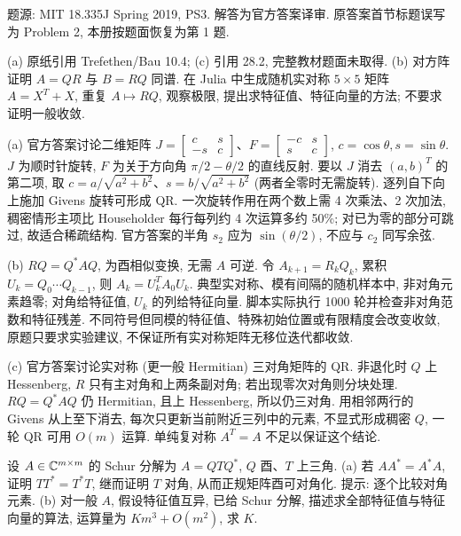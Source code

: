 题源: MIT 18.335J Spring 2019, PS3. 解答为官方答案译审. 原答案首节标题误写为 Problem 2, 本册按题面恢复为第 1 题.
\begin{exercise}\label{ps3:q1}
(a) 原纸引用 Trefethen/Bau 10.4; (c) 引用 28.2, 完整教材题面未取得.
(b) 对方阵证明 $A=QR$ 与 $B=RQ$ 同谱. 在 Julia 中生成随机实对称 $5\times5$ 矩阵 $A=X^T+X$, 重复 $A\mapsto RQ$, 观察极限, 提出求特征值、特征向量的方法; 不要求证明一般收敛.
\end{exercise}
\begin{solution}
(a) 官方答案讨论二维矩阵 $J=\begin{bmatrix}c&s\\-s&c\end{bmatrix}$、$F=\begin{bmatrix}-c&s\\s&c\end{bmatrix}$, $c=\cos\theta,s=\sin\theta$. $J$ 为顺时针旋转, $F$ 为关于方向角 $\pi/2-\theta/2$ 的直线反射. 要以 $J$ 消去 $(a,b)^T$ 的第二项, 取 $c=a/\sqrt{a^2+b^2}$、$s=b/\sqrt{a^2+b^2}$ (两者全零时无需旋转). 逐列自下向上施加 Givens 旋转可形成 QR. 一次旋转作用在两个数上需 4 次乘法、2 次加法, 稠密情形主项比 Householder 每行每列约 4 次运算多约 50\%; 对已为零的部分可跳过, 故适合稀疏结构. 官方答案的半角 $s_2$ 应为 $\sin(\theta/2)$, 不应与 $c_2$ 同写余弦.

(b) $RQ=Q^*AQ$, 为酉相似变换, 无需 $A$ 可逆. 令 $A_{k+1}=R_kQ_k$, 累积 $U_k=Q_0\cdots Q_{k-1}$, 则 $A_k=U_k^TA_0U_k$. 典型实对称、模有间隔的随机样本中, 非对角元素趋零; 对角给特征值, $U_k$ 的列给特征向量. 脚本实际执行 1000 轮并检查非对角范数和特征残差. 不同符号但同模的特征值、特殊初始位置或有限精度会改变收敛, 原题只要求实验建议, 不保证所有实对称矩阵无移位迭代都收敛.

(c) 官方答案讨论实对称 (更一般 Hermitian) 三对角矩阵的 QR. 非退化时 $Q$ 上 Hessenberg, $R$ 只有主对角和上两条副对角; 若出现零次对角则分块处理. $RQ=Q^*AQ$ 仍 Hermitian, 且上 Hessenberg, 所以仍三对角. 用相邻两行的 Givens 从上至下消去, 每次只更新当前附近三列中的元素, 不显式形成稠密 $Q$, 一轮 QR 可用 $O(m)$ 运算. 单纯复对称 $A^T=A$ 不足以保证这个结论.
\end{solution}
\begin{exercise}\label{ps3:q2}
设 $A\in\mathbb C^{m\times m}$ 的 Schur 分解为 $A=QTQ^*$, $Q$ 酉、$T$ 上三角.
(a) 若 $AA^*=A^*A$, 证明 $TT^*=T^*T$, 继而证明 $T$ 对角, 从而正规矩阵酉可对角化. 提示: 逐个比较对角元素.
(b) 对一般 $A$, 假设特征值互异, 已给 Schur 分解, 描述求全部特征值与特征向量的算法, 运算量为 $Km^3+O(m^2)$, 求 $K$.
\end{exercise}
